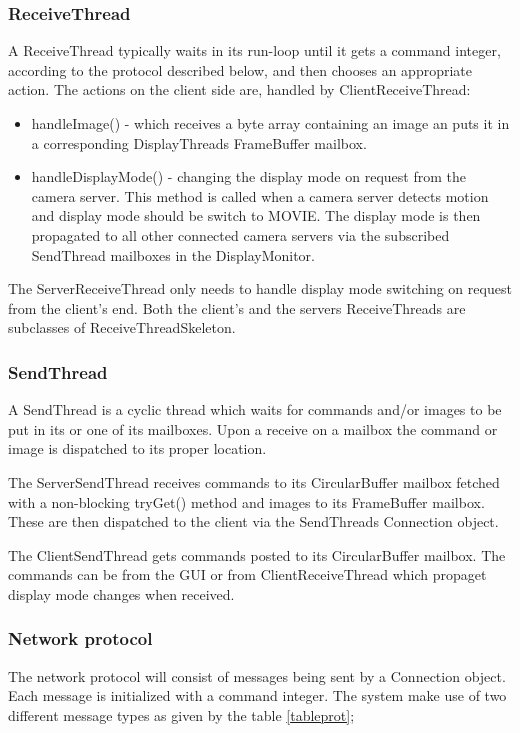 \documentclass[8pt,titlepage]{article}
\begin{document}
\subsubsection{ReceiveThread}
A ReceiveThread typically waits in its run-loop until it gets a command integer, according to the protocol described below, and then chooses an appropriate action. The actions on the client side are, handled by ClientReceiveThread:
\begin{itemize}
\item handleImage() - which receives a byte array containing an image an puts it in a corresponding DisplayThreads FrameBuffer mailbox.
\item handleDisplayMode() - changing the display mode on request from the camera server. This method is called when a camera server detects motion and display mode should be switch to MOVIE. The display mode is then propagated to all other connected camera servers via the subscribed SendThread mailboxes in the DisplayMonitor.
\end{itemize}

The ServerReceiveThread only needs to handle display mode switching on request from the client’s end. Both the client’s and the servers ReceiveThreads are subclasses of ReceiveThreadSkeleton.

\subsubsection{SendThread}
A SendThread is a cyclic thread which waits for commands and/or images to be put in its or one of its mailboxes. Upon a receive on a mailbox the command or image is dispatched to its proper location. 

The ServerSendThread receives commands to its CircularBuffer mailbox fetched with a non-blocking tryGet() method and images to its FrameBuffer mailbox. These are then dispatched to the client via the SendThreads Connection object.

The ClientSendThread gets commands posted to its CircularBuffer mailbox. The commands can be from the GUI or from ClientReceiveThread which propaget display mode changes when received.

\subsubsection{Network protocol}
The network protocol will consist of messages being sent by a Connection object. Each message is initialized with a command integer. The system make use of two different message types as given by the table \ref{tableprot};
\end{document}
